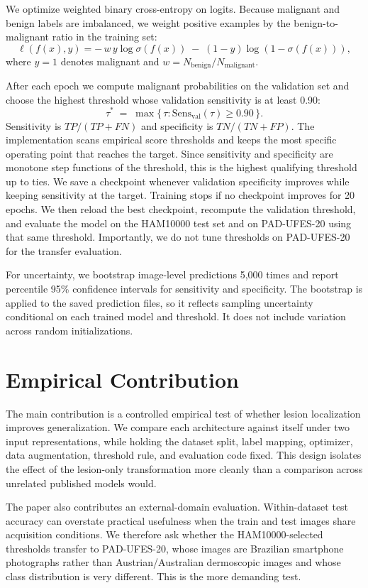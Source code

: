 \documentclass[10pt]{article}
\begin{document}
We optimize weighted binary cross-entropy on logits. Because malignant and benign labels are imbalanced, we weight positive examples by the benign-to-malignant ratio in the training set:
\[
    \ell(f(x), y) =
    -\, w\, y \log \sigma(f(x)) \;-\; (1-y)\log(1-\sigma(f(x))),
\]
where $y=1$ denotes malignant and $w = N_{\text{benign}}/N_{\text{malignant}}$.

After each epoch we compute malignant probabilities on the validation set and choose the highest threshold whose validation sensitivity is at least 0.90:
\[
    \tau^* \;=\; \max \{\, \tau : \mathrm{Sens}_{\mathrm{val}}(\tau) \geq 0.90 \,\}.
\]
Sensitivity is $TP/(TP+FN)$ and specificity is $TN/(TN+FP)$. The implementation scans empirical score thresholds and keeps the most specific operating point that reaches the target. Since sensitivity and specificity are monotone step functions of the threshold, this is the highest qualifying threshold up to ties. We save a checkpoint whenever validation specificity improves while keeping sensitivity at the target. Training stops if no checkpoint improves for 20 epochs. We then reload the best checkpoint, recompute the validation threshold, and evaluate the model on the HAM10000 test set and on PAD-UFES-20 using that same threshold. Importantly, we do not tune thresholds on PAD-UFES-20 for the transfer evaluation.

For uncertainty, we bootstrap image-level predictions 5{,}000 times and report percentile 95\% confidence intervals for sensitivity and specificity. The bootstrap is applied to the saved prediction files, so it reflects sampling uncertainty conditional on each trained model and threshold. It does not include variation across random initializations.

\section{Empirical Contribution}

The main contribution is a controlled empirical test of whether lesion localization improves generalization. We compare each architecture against itself under two input representations, while holding the dataset split, label mapping, optimizer, data augmentation, threshold rule, and evaluation code fixed. This design isolates the effect of the lesion-only transformation more cleanly than a comparison across unrelated published models would.

The paper also contributes an external-domain evaluation. Within-dataset test accuracy can overstate practical usefulness when the train and test images share acquisition conditions. We therefore ask whether the HAM10000-selected thresholds transfer to PAD-UFES-20, whose images are Brazilian smartphone photographs rather than Austrian/Australian dermoscopic images and whose class distribution is very different. This is the more demanding test.
\end{document}
